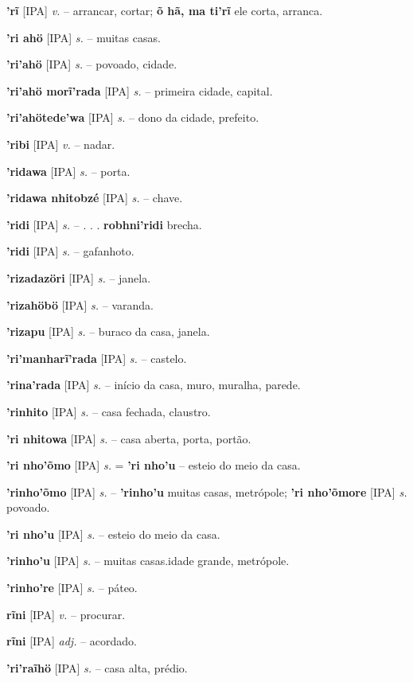 \textbf{'rĩ} [IPA] \textit{v.} -- arrancar, cortar; \textbf{õ hã, ma ti'rĩ} ele corta, arranca.

\textbf{'ri ahö} [IPA] \textit{s.} -- muitas casas.

\textbf{'ri'ahö} [IPA] \textit{s.} -- povoado, cidade.

\textbf{'ri'ahö morĩ'rada} [IPA] \textit{s.} -- primeira cidade, capital.

\textbf{'ri'ahötede'wa} [IPA] \textit{s.} -- dono da cidade, prefeito.

\textbf{'ribi} [IPA] \textit{v.} -- nadar.

\textbf{'ridawa} [IPA] \textit{s.} -- porta.

\textbf{'ridawa nhitobzé} [IPA] \textit{s.} -- chave.

\textbf{'ridi} [IPA] \textit{s.} -- . . . \textbf{robhni'ridi} brecha.

\textbf{'ridi} [IPA] \textit{s.} -- gafanhoto.

\textbf{'rizadazöri} [IPA] \textit{s.} -- janela.

\textbf{'rizahöbö} [IPA] \textit{s.} -- varanda.

\textbf{'rizapu} [IPA] \textit{s.} -- buraco da casa, janela.

\textbf{'ri'manharĩ'rada} [IPA] \textit{s.} -- castelo.

\textbf{'rina'rada} [IPA] \textit{s.} -- início da casa, muro, muralha, parede.

\textbf{'rinhito} [IPA] \textit{s.} -- casa fechada, claustro.

\textbf{'ri nhitowa} [IPA] \textit{s.} -- casa aberta, porta, portão.

\textbf{'ri nho'õmo} [IPA] \textit{s.} = \textbf{'ri nho'u} -- esteio do meio da casa.

\textbf{'rinho'õmo} [IPA] \textit{s.} -- \textbf{'rinho'u} muitas casas, metrópole; \textbf{'ri nho'õmore} [IPA] \textit{s.} povoado.

\textbf{'ri nho'u} [IPA] \textit{s.} -- esteio do meio da casa.

\textbf{'rinho'u} [IPA] \textit{s.} -- muitas casas.idade grande, metrópole.

\textbf{'rinho're} [IPA] \textit{s.} -- páteo.

\textbf{rĩni} [IPA] \textit{v.} -- procurar.

\textbf{rĩni} [IPA] \textit{adj.} -- acordado.

\textbf{'ri'raĩhö} [IPA] \textit{s.} -- casa alta, prédio.

